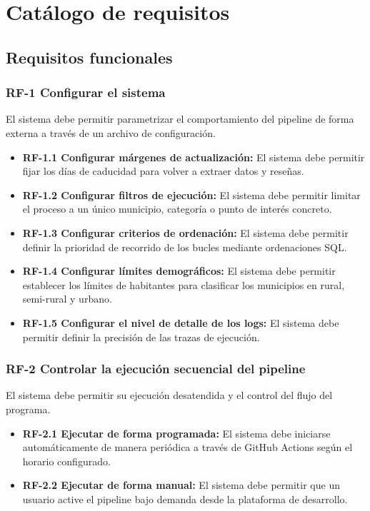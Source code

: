 \section{Catálogo de requisitos}

\subsection{Requisitos funcionales}

\subsubsection{RF-1 Configurar el sistema}
El sistema debe permitir parametrizar el comportamiento del pipeline de forma externa a través de un archivo de configuración.

\begin{itemize}
    \item \textbf{RF-1.1 Configurar márgenes de actualización:} El sistema debe permitir fijar los días de caducidad para volver a extraer datos y reseñas.
    \item \textbf{RF-1.2 Configurar filtros de ejecución:} El sistema debe permitir limitar el proceso a un único municipio, categoría o punto de interés concreto.
    \item \textbf{RF-1.3 Configurar criterios de ordenación:} El sistema debe permitir definir la prioridad de recorrido de los bucles mediante ordenaciones SQL.
    \item \textbf{RF-1.4 Configurar límites demográficos:} El sistema debe permitir establecer los límites de habitantes para clasificar los municipios en rural, semi-rural y urbano.
    \item \textbf{RF-1.5 Configurar el nivel de detalle de los logs:} El sistema debe permitir definir la precisión de las trazas de ejecución.
\end{itemize}

\subsubsection{RF-2 Controlar la ejecución secuencial del pipeline}
El sistema debe permitir su ejecución desatendida y el control del flujo del programa.

\begin{itemize}
    \item \textbf{RF-2.1 Ejecutar de forma programada:} El sistema debe iniciarse automáticamente de manera periódica a través de GitHub Actions según el horario configurado.
    \item \textbf{RF-2.2 Ejecutar de forma manual:} El sistema debe permitir que un usuario active el pipeline bajo demanda desde la plataforma de desarrollo.
\end{itemize}

